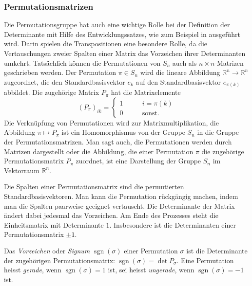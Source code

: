 \subsubsection{Permutationsmatrizen}
Die Permutationsgruppe hat auch eine wichtige Rolle bei der Definition
der Determinante mit Hilfe des Entwicklungssatzes, wie zum Beispiel
in \cite[Kapitel~4]{buch:linalg} ausgeführt wird.
Darin spielen die Transpositionen eine besondere Rolle, da die
Vertauschungen zweier Spalten einer Matrix das Vorzeichen ihrer
Determinanten umkehrt.
Tatsächlich können die Permutationen von $S_n$ auch als
$n\times n$-Matrizen geschrieben werden.
Der Permutation $\pi\in S_n$ wird die lineare Abbildung
$\mathbb{R}^n\to\mathbb{R}^n$ zugeordnet, die den Standardbasisvektor
$e_k$ auf den Standardbasisvektor $e_{\pi(k)}$ abbildet.
Die zugehörige Matrix $P_\pi$ hat die Matrixelemente
\[
(P_\pi)_{ik} 
=
\begin{cases}
1&\qquad i = \pi(k)\\
0&\qquad\text{sonst}.
\end{cases}
\]
Die Verknüpfung von Permutationen wird zur Matrixmultiplikation,
die Abbildung $\pi \mapsto P_\pi$ ist ein Homomorphismus
von der Gruppe $S_n$ in die Gruppe der Permutationsmatrizen.
Man sagt auch, die Permutationen werden durch Matrizen dargestellt oder
die Abbildung, die einer Permutation $\pi$ die zugehörige
Permutationsmatrix $P_\pi$ zuordnet, ist eine Darstellung der
Gruppe $S_n$ im Vektorraum $\mathbb{R}^n$.

Die Spalten einer Permutationsmatrix sind die permutierten
Standardbasisvektoren.
Man kann die Permutation rückgängig machen, indem man die Spalten
paarweise geeignet vertauscht.
Die Determinante der Matrix ändert dabei jedesmal das Vorzeichen.
Am Ende des Prozesses steht die Einheitsmatrix mit Determinante $1$.
Insbesondere ist die Determinanten einer Permutationsmatrix $\pm 1$.

\begin{definition}
%
%
Das {\em Vorzeichen} oder {\em Signum}
$\operatorname{sgn}(\sigma)$
einer Permutation $\sigma$
ist die Determinante der zugehörigen Permutationsmatrix:
$\operatorname{sgn}(\sigma)=\det P_\sigma$.
Eine Permutation heisst {\em gerade}, wenn $\operatorname{sgn}(\sigma)=1$ ist,
sei heisst {\em ungerade}, wenn $\operatorname{sgn}(\sigma)=-1$ ist.
%
%
\end{definition}

